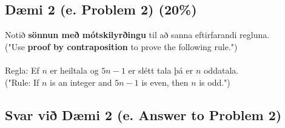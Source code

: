 \subsection*{Dæmi 2 (e. Problem 2) (20\%)\label{section:daemi2}}
Notið \textbf{sönnun með mótskilyrðingu} til að sanna eftirfarandi regluna. \\
("Use \textbf{proof by contraposition} to prove the following rule.")\\ \\
\indent Regla: Ef $n$ er heiltala og $5n - 1$ er slétt tala þá er $n$ oddatala. \\
\indent ("Rule: If $n$ is an integer and $5n-1$ is even, then $n$ is odd.")

\subsection*{Svar við Dæmi 2 (e. Answer to Problem 2)}

\newcommand{\makeAnswerBoxProblemTwo}{
  \noindent
  \begin{tcolorbox}[colframe=black, colback=white, boxrule=0.5pt, arc=0pt, outer arc=0pt, height=\dimexpr\textheight-\ht\strutbox-9\baselineskip\relax]

    
  \end{tcolorbox}
}

\makeAnswerBoxProblemTwo



